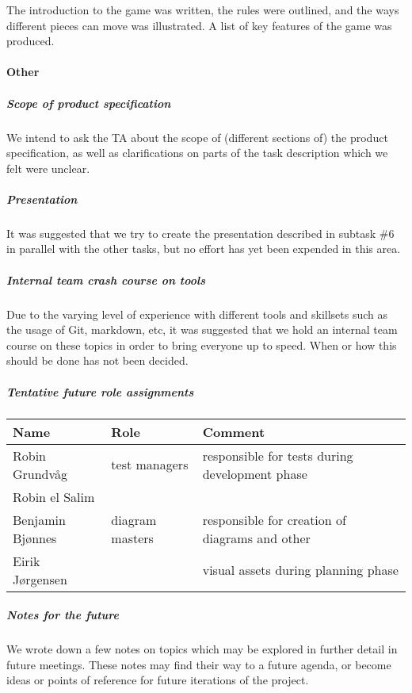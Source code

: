 \documentclass{article}
\begin{document}
The introduction to the game was written, the rules were outlined, and the ways different pieces can move was illustrated. A list of key features of the game was produced.

\paragraph{Other}

\subparagraph{Scope of product specification}

We intend to ask the TA about the scope of (different sections of) the product specification, as well as clarifications on parts of the task description which we felt were unclear.

\subparagraph{Presentation}

It was suggested that we try to create the presentation described in subtask \#6 in parallel with the other tasks, but no effort has yet been expended in this area.

\subparagraph{Internal team crash course on tools}

Due to the varying level of experience with different tools and skillsets such as the usage of Git, markdown, etc, it was suggested that we hold an internal team course on these topics in order to bring everyone up to speed. When or how this should be done has not been decided.

\subparagraph{Tentative future role assignments}

\mbox{}\newline\newline
\begin{tabular}{l l l}
    Name             & Role            & Comment \\
    \hline
    Robin Grundvåg   & test managers   & responsible for tests during development phase \\
    Robin el Salim   &                 & \\
    Benjamin Bjønnes & diagram masters & responsible for creation of diagrams and other \\
    Eirik Jørgensen  &                 & visual assets during planning phase

\end{tabular}

\subparagraph{Notes for the future}

We wrote down a few notes on topics which may be explored in further detail in future meetings. These notes may find their way to a future agenda, or become ideas or points of reference for future iterations of the project.
\end{document}
